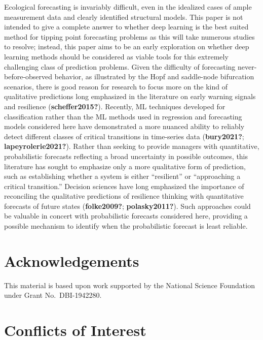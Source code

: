 \documentclass{article}
\begin{document}
Ecological forecasting is invariably difficult, even in the idealized
cases of ample measurement data and clearly identified structural
models. This paper is not intended to give a complete answer to whether
deep learning is the best suited method for tipping point forecasting
problems as this will take numerous studies to resolve; instead, this
paper aims to be an early exploration on whether deep learning methods
should be considered as viable tools for this extremely challenging
class of prediction problems. Given the difficulty of forecasting
never-before-observed behavior, as illustrated by the Hopf and
saddle-node bifurcation scenarios, there is good reason for research to
focus more on the kind of qualitative predictions long emphasized in the
literature on early warning signals and resilience
(\textbf{scheffer2015?}). Recently, ML techniques developed for
classification rather than the ML methods used in regression and
forecasting models considered here have demonstrated a more nuanced
ability to reliably detect different classes of critical transitions in
time-series data (\textbf{bury2021?}; \textbf{lapeyrolerie2021?}).
Rather than seeking to provide managers with quantitative, probabilistic
forecasts reflecting a broad uncertainty in possible outcomes, this
literature has sought to emphasize only a more qualitative form of
prediction, such as establishing whether a system is either
``resilient'' or ``approaching a critical transition.'' Decision
sciences have long emphasized the importance of reconciling the
qualitative predictions of resilience thinking with quantitative
forecasts of future states (\textbf{folke2009?}; \textbf{polasky2011?}).
Such approaches could be valuable in concert with probabilistic
forecasts considered here, providing a possible mechanism to identify
when the probabilistic forecast is least reliable.

\hypertarget{acknowledgements}{%
\section{Acknowledgements}\label{acknowledgements}}

This material is based upon work supported by the National Science
Foundation under Grant No.~DBI-1942280.

\hypertarget{conflicts-of-interest}{%
\section*{Conflicts of Interest}\label{conflicts-of-interest}}
\end{document}
